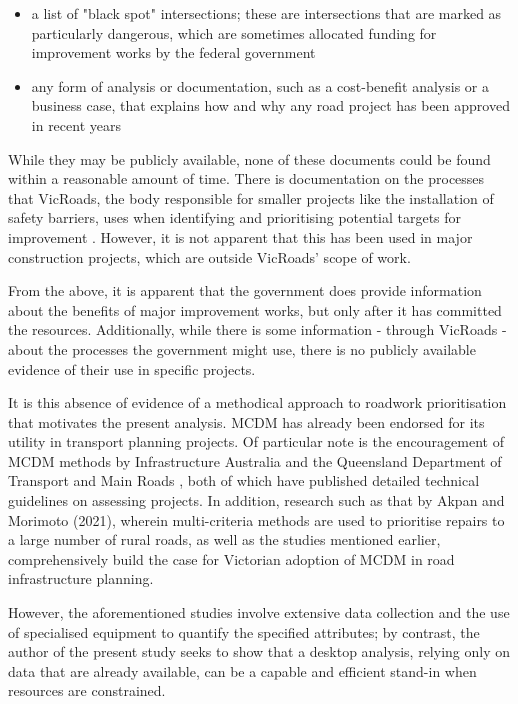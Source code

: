 \documentclass[11pt, a4paper]{article}
\begin{document}
    \begin{itemize}
        \item a list of "black spot" intersections; these are intersections that are marked as particularly dangerous, which are sometimes allocated funding for improvement works by the federal government \parencite{a8}
        \item any form of analysis or documentation, such as a cost-benefit analysis or a business case, that explains how and why any road project has been approved in recent years
    \end{itemize}

    While they may be publicly available, none of these documents could be found within a reasonable amount of time. There is documentation on the processes that VicRoads, the body responsible for smaller projects like the installation of safety barriers, uses when identifying and prioritising potential targets for improvement \parencite{a9}. However, it is not apparent that this has been used in major construction projects, which are outside VicRoads' scope of work.

    From the above, it is apparent that the government does provide information about the benefits of major improvement works, but only after it has committed the resources. Additionally, while there is some information - through VicRoads - about the processes the government might use, there is no publicly available evidence of their use in specific projects.
    
    It is this absence of evidence of a methodical approach to roadwork prioritisation that motivates the present analysis. MCDM has already been endorsed for its utility in transport planning projects. Of particular note is the encouragement of MCDM methods by Infrastructure Australia and the Queensland Department of Transport and Main Roads \parencite{a10}, both of which have published detailed technical guidelines on assessing projects. In addition, research such as that by Akpan and Morimoto (2021), wherein multi-criteria methods are used to prioritise repairs to a large number of rural roads, as well as the studies mentioned earlier, comprehensively build the case for Victorian adoption of MCDM in road infrastructure planning.
    
    However, the aforementioned studies involve extensive data collection and the use of specialised equipment to quantify the specified attributes; by contrast, the author of the present study seeks to show that a desktop analysis, relying only on data that are already available, can be a capable and efficient stand-in when resources are constrained.
    
\end{document}
